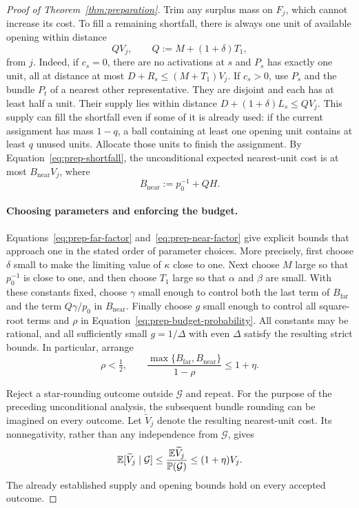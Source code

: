 \begin{proof}[Proof of Theorem~\ref{thm:preparation}]
Trim any surplus mass on $F_j$, which cannot increase its cost.  To
fill a remaining shortfall, there is always one unit of available
opening within distance
\[
 QV_j,\qquad Q:=M+(1+\delta)T_1,
\]
from $j$.  Indeed, if $c_s=0$, there are no activations at $s$ and $P_s$
has exactly one unit, all at distance at most
$D+R_s\le(M+T_1)V_j$.  If $c_s>0$, use $P_s$ and the bundle $P_t$ of a
nearest other representative.  They are disjoint and each has at
least half a unit.  Their supply lies within distance
$D+(1+\delta)L_s\le QV_j$.
This supply can fill the shortfall even if some of it is already used:
if the current assignment has mass $1-q$, a ball containing at least
one opening unit contains at least $q$ unused units.  Allocate those
units to finish the assignment.  By Equation~\ref{eq:prep-shortfall},
the unconditional expected nearest-unit cost is at most
$B_{\mathrm{near}}V_j$, where
\begin{equation}\label{eq:prep-near-factor}
 B_{\mathrm{near}}:=p_0^{-1}+QH.
\end{equation}

\paragraph{Choosing parameters and enforcing the budget.}
Equations~\ref{eq:prep-far-factor} and~\ref{eq:prep-near-factor} give
explicit bounds that approach one in the stated order of parameter
choices.  More precisely, first choose $\delta$ small to make the
limiting value of $\kappa$ close to one.  Next choose $M$ large so that
$p_0^{-1}$ is close to one, and then choose $T_1$ large so that $\alpha$
and $\beta$ are small.  With these constants fixed, choose $\gamma$
small enough to control both the last term of $B_{\mathrm{far}}$ and
the term $Q\gamma/p_0$ in $B_{\mathrm{near}}$.  Finally choose $g$ small
enough to control all square-root terms and $\rho$ in
Equation~\ref{eq:prep-budget-probability}.  All constants may be
rational, and all sufficiently small $g=1/\Delta$ with even $\Delta$
satisfy the resulting strict bounds.  In particular, arrange
\[
 \rho<\tfrac12,\qquad
 \frac{\max\{B_{\mathrm{far}},B_{\mathrm{near}}\}}{1-\rho}
 \le1+\eta.
\]

Reject a star-rounding outcome outside $\mathcal G$ and repeat.
For the purpose of the preceding unconditional analysis, the subsequent
bundle rounding can be imagined on every outcome.  Let
$\widetilde V_j$ denote the resulting nearest-unit cost.  Its
nonnegativity, rather than any independence from $\mathcal G$, gives
\begin{equation}\label{eq:prep-cost-final}
 \mathbb E[\widetilde V_j\mid\mathcal G]
 \le\frac{\mathbb E\widetilde V_j}{\mathbb P(\mathcal G)}
 \le(1+\eta)V_j.
\end{equation}
The already established supply and opening bounds hold on every
accepted outcome.


\end{proof}

